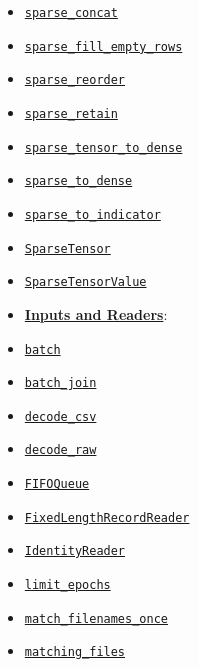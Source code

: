\begin{itemize}
\item
  \href{../../api_docs/python/sparse_ops.md\#sparse_concat}{\texttt{sparse\_concat}}
\item
  \href{../../api_docs/python/sparse_ops.md\#sparse_fill_empty_rows}{\texttt{sparse\_fill\_empty\_rows}}
\item
  \href{../../api_docs/python/sparse_ops.md\#sparse_reorder}{\texttt{sparse\_reorder}}
\item
  \href{../../api_docs/python/sparse_ops.md\#sparse_retain}{\texttt{sparse\_retain}}
\item
  \href{../../api_docs/python/sparse_ops.md\#sparse_tensor_to_dense}{\texttt{sparse\_tensor\_to\_dense}}
\item
  \href{../../api_docs/python/sparse_ops.md\#sparse_to_dense}{\texttt{sparse\_to\_dense}}
\item
  \href{../../api_docs/python/sparse_ops.md\#sparse_to_indicator}{\texttt{sparse\_to\_indicator}}
\item
  \href{../../api_docs/python/sparse_ops.md\#SparseTensor}{\texttt{SparseTensor}}
\item
  \href{../../api_docs/python/sparse_ops.md\#SparseTensorValue}{\texttt{SparseTensorValue}}
\item
  \textbf{\href{../../api_docs/python/io_ops.md}{Inputs and Readers}}:
\item
  \href{../../api_docs/python/io_ops.md\#batch}{\texttt{batch}}
\item
  \href{../../api_docs/python/io_ops.md\#batch_join}{\texttt{batch\_join}}
\item
  \href{../../api_docs/python/io_ops.md\#decode_csv}{\texttt{decode\_csv}}
\item
  \href{../../api_docs/python/io_ops.md\#decode_raw}{\texttt{decode\_raw}}
\item
  \href{../../api_docs/python/io_ops.md\#FIFOQueue}{\texttt{FIFOQueue}}
\item
  \href{../../api_docs/python/io_ops.md\#FixedLengthRecordReader}{\texttt{FixedLengthRecordReader}}
\item
  \href{../../api_docs/python/io_ops.md\#IdentityReader}{\texttt{IdentityReader}}
\item
  \href{../../api_docs/python/io_ops.md\#limit_epochs}{\texttt{limit\_epochs}}
\item
  \href{../../api_docs/python/io_ops.md\#match_filenames_once}{\texttt{match\_filenames\_once}}
\item
  \href{../../api_docs/python/io_ops.md\#matching_files}{\texttt{matching\_files}}

\end{itemize}
